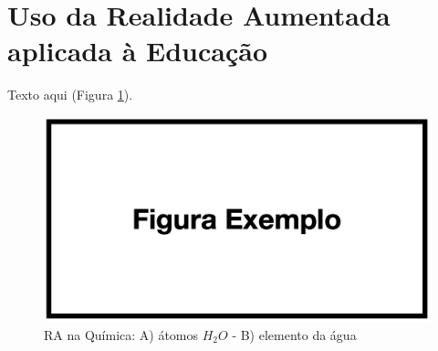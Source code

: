 \section{Uso da Realidade Aumentada aplicada à Educação}\label{sec:aplicada}

Texto aqui (Figura \ref{fig:Fig_Cavalli2024}).

\begin{figure}[ht]
\centering
\includegraphics[width=.99\textwidth]{figura.png}
\caption{RA na Química: A) átomos $H_2O$ - B) elemento da água}
\label{fig:Fig_Cavalli2024}
\end{figure}